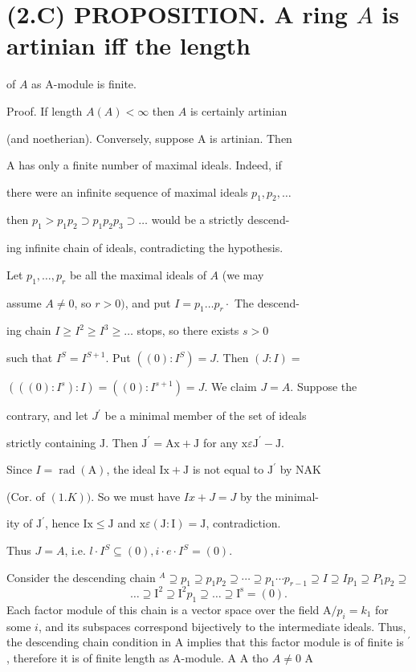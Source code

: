 \section{(2.C) PROPOSITION. A ring $A$ is artinian iff the length}
of $A$ as A-module is finite.

Proof. If length $A(A)<\infty$ then $A$ is certainly artinian

(and noetherian). Conversely, suppose A is artinian. Then

A has only a finite number of maximal ideals. Indeed, if

there were an infinite sequence of maximal ideals $p_{1}, p_{2}, \ldots$

then $p_{1}>p_{1} p_{2} \supset p_{1} p_{2} p_{3} \supset \ldots$ would be a strictly descend-

ing infinite chain of ideals, contradicting the hypothesis.

Let $p_{1}, \ldots, p_{r}$ be all the maximal ideals of $A$ (we may

assume $A \neq 0$, so $r>0)$, and put $I=p_{1} \ldots p_{r} \cdot$ The descend-

ing chain $I \geq I^{2} \geq I^{3} \geq \ldots$ stops, so there exists $s>0$

such that $I^{S}=I^{S+1}$. Put $\left((0): I^{S}\right)=J$. Then $(J: I)=$

$\left(\left((0): I^{s}\right): I\right)=\left((0): I^{s+1}\right)=J$. We claim $J=A$. Suppose the

contrary, and let $J^{\prime}$ be a minimal member of the set of ideals

strictly containing $\mathrm{J}$. Then $\mathrm{J}^{\prime}=\mathrm{Ax}+\mathrm{J}$ for any $\mathrm{x} \varepsilon \mathrm{J}^{\prime}-\mathrm{J}$.

Since $I=\operatorname{rad}(\mathrm{A})$, the ideal $\mathrm{Ix}+\mathrm{J}$ is not equal to $\mathrm{J}^{\prime}$ by NAK

(Cor. of $(1 . K))$. So we must have $I x+J=J$ by the minimal-

ity of $\mathrm{J}^{\prime}$, hence $\mathrm{Ix} \leqslant \mathrm{J}$ and $\mathrm{x} \varepsilon(\mathrm{J}: \mathrm{I})=\mathrm{J}$, contradiction.

Thus $J=A$, i.e. $l \cdot I^{S} \subseteq(0), i \cdot e \cdot I^{S}=(0)$.

Consider the descending chain ${ }^{A} \supseteq p_{1} \supseteq p_{1} p_{2} \supseteq \cdots \supseteq p_{1} \cdots p_{r-1} \supseteq I \supseteq I p_{1} \supseteq P_{1} p_{2} \supseteq$
$$
\ldots \supseteq \mathrm{I}^{2} \supseteq \mathrm{I}^{2} p_{1} \supseteq \ldots \supseteq \mathrm{I}^{\mathrm{s}}=(0) .
$$
Each factor module of this chain is a vector space over the field $\mathrm{A} / p_{i}=k_{1}$ for some $i$, and its subspaces correspond bijectively to the intermediate ideals. Thus, the descending chain condition in A implies that this factor module is of finite is ${ }^{\prime}$, therefore it is of finite length as A-module. A A tho $A \neq 0$ A

